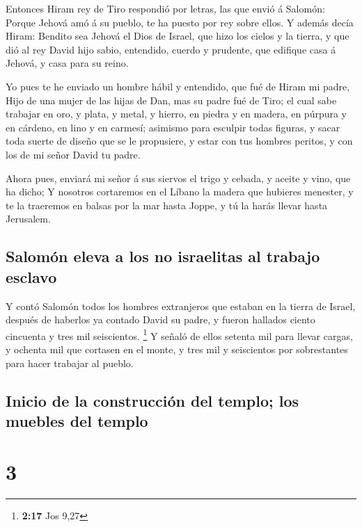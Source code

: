  Entonces Hiram rey de Tiro respondió por letras, las que
envió á Salomón: Porque Jehová amó á su pueblo, te ha puesto por rey
sobre ellos.  Y además decía Hiram: Bendito sea Jehová el
Dios de Israel, que hizo los cielos y la tierra, y que dió al rey David
hijo sabio, entendido, cuerdo y prudente, que edifique casa á Jehová, y
casa para su reino.

 Yo pues te he enviado un hombre hábil y entendido, que fué
de Hiram mi padre,  Hijo de una mujer de las hijas de Dan,
mas su padre fué de Tiro; el cual sabe trabajar en oro, y plata, y
metal, y hierro, en piedra y en madera, en púrpura y en cárdeno, en lino
y en carmesí; asimismo para esculpir todas figuras, y sacar toda suerte
de diseño que se le propusiere, y estar con tus hombres peritos, y con
los de mi señor David tu padre.

 Ahora pues, enviará mi señor á sus siervos el trigo y
cebada, y aceite y vino, que ha dicho;  Y nosotros
cortaremos en el Líbano la madera que hubieres menester, y te la
traeremos en balsas por la mar hasta Joppe, y tú la harás llevar hasta
Jerusalem.

\hypertarget{salomuxf3n-eleva-a-los-no-israelitas-al-trabajo-esclavo}{%
\subsection{Salomón eleva a los no israelitas al trabajo
esclavo}\label{salomuxf3n-eleva-a-los-no-israelitas-al-trabajo-esclavo}}

 Y contó Salomón todos los hombres extranjeros que estaban
en la tierra de Israel, después de haberlos ya contado David su padre, y
fueron hallados ciento cincuenta y tres mil seiscientos. \footnote{\textbf{2:17}
  Jos 9,27}  Y señaló de ellos setenta mil para llevar
cargas, y ochenta mil que cortasen en el monte, y tres mil y seiscientos
por sobrestantes para hacer trabajar al pueblo.

\hypertarget{inicio-de-la-construcciuxf3n-del-templo-los-muebles-del-templo}{%
\subsection{Inicio de la construcción del templo; los muebles del
templo}\label{inicio-de-la-construcciuxf3n-del-templo-los-muebles-del-templo}}

\hypertarget{section-2}{%
\section{3}\label{section-2}}

